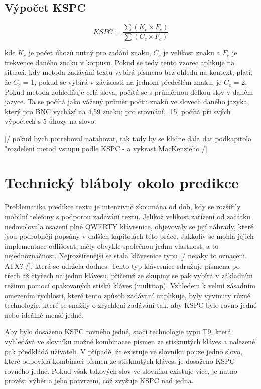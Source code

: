 \documentclass{article}
\begin{document}
\subsection{Výpočet KSPC}


\[
	KSPC = \frac{\sum{ (K_c × F_c) }}{\sum{ (C_c × F_c) }}
\]

kde $K_c$ je počet úhozů nutný pro zadání znaku, $C_c$ je velikost znaku a $F_c$ je frekvence daného znaku v korpusu. Pokud se tedy tento vzorec aplikuje na situaci, kdy metoda zadávání textu vybírá písmeno bez ohledu na kontext, platí, že $C_c$ = 1, pokud se vybírá v závislosti na jednom předešlém znaku, je $C_c$ = 2. Pokud metoda zohledňuje celá slova, počítá se s průměrnou délkou slov v daném jazyce. Ta se počítá jako vážený průměr počtu znaků ve slovech daného jazyka, který pro BNC vychází na 4,59 znaku; pro srovnání, [15] počítá při svých výpočtech s 5 úhozy na slovo.


[/ pokud bych potreboval natahovat, tak tady by se klidne dala dat podkapitola "rozdeleni metod vstupu podle KSPC - a vykrast MacKenzieho  /]


\section{Technický bláboly okolo predikce}


Problematika predikce textu je intenzivně zkoumána od dob, kdy se rozšířily mobilní telefony s podporou zadávání textu. Jelikož velikost zařízení od začátku nedovolovala osazení plné QWERTY klávesnice, objevovaly se její náhrady, které jsou podrobněji popsány v dalších kapitolách této práce. Jakkoliv se mohla jejich implementace odlišovat, měly obvykle společnou jednu vlastnost, a to nejednoznačnost. Nejrozšířenější se stala klávesnice typu  [/ nejaky to oznaceni, ATX? /], která se udržela dodnes. Tento typ klávesnice sdružuje písmena po třech až čtyřech na jednu klávesu, přičemž ze skupiny se pak vybírá v základním režimu pomocí opakovaných stisků kláves (multitap). Vzhledem k velmi zásadním omezením rychlosti, které tento způsob zadávaní implikuje, byly vyvinuty různé technologie, které se snažily o zrychlení zadávání tak, aby KSPC bylo rovno jedné nebo ideálně menší jedné.

Aby bylo dosaženo KSPC rovného jedné, stačí technologie typu T9, která vyhledává ve slovníku možné kombinacee písmen ze stisknutých kláves a nalezené pak předkládá uživateli. V případě, že existuje ve slovníku pouze jedno slovo, které odpovídá kombinaci písmen ze stisknutých kláves, je dosaženo KSPC rovného jedné. Pokud však takových slov ve slovníku existuje více, je nutno provést výběr a jeho potvrzení, což zvyšuje KSPC nad jedna.
\end{document}
